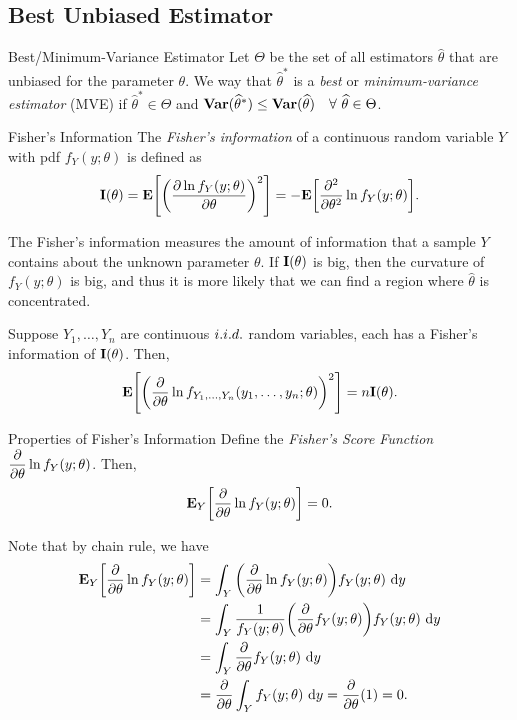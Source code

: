 \subsection{Best Unbiased Estimator}
\begin{df}{Best/Minimum-Variance Estimator}
	Let $\Theta$ be the set of all estimators $\hat\theta$ that are unbiased for the parameter $\theta$. We way that $\hat\theta^*$ is a \textit{best} or \textit{minimum-variance estimator} (MVE) if $\hat\theta^*\in\Theta$ and $\Var(\hat\theta^*)\leq\Var(\hat\theta)\quad\forall\ \hat\theta\in\Theta$.
\end{df}
\begin{df}{Fisher's Information}
	The \textit{Fisher's information} of a continuous random variable $Y$ with pdf $f_Y(y;\theta)$ is defined as \[\vb{I}(\theta)=\vb{E}\qty[\qty(\pdv{\ln f_Y(y;\theta)}{\theta})^2]=-\vb{E}\qty[\pdv[2]{\theta}\ln f_Y(y;\theta)].\]
\end{df}
\begin{rmk}
	The Fisher's information measures the amount of information that a sample $Y$ contains about the unknown parameter $\theta$. If $\vb{I}(\theta)$ is big, then the curvature of $f_Y(y;\theta)$ is big, and thus it is more likely that we can find a region where $\hat\theta$ is concentrated. 
\end{rmk}
\begin{ext}
	Suppose	$Y_1,\dots,Y_n$ are continuous $i.i.d.$ random variables, each has a Fisher's information of $\vb{I}(\theta)$. Then, \[\vb{E}\qty[\qty(\pdv{\theta}\ln f_{Y_1,\dots,Y_n}(y_1,\dots,y_n;\theta))^2]=n\vb{I}(\theta).\]
\end{ext}
\begin{thm}{Properties of Fisher's Information}
	Define the \textit{Fisher's Score Function}	$\displaystyle\pdv{\theta}\ln f_Y(y;\theta)$. Then, \[\vb{E}_Y\qty[\pdv{\theta}\ln f_Y(y;\theta)]=0.\]
\end{thm}
\begin{prf}
	Note that by chain rule, we have \begin{align*}
		\E_Y\qty[\pdv{\theta}\ln f_Y(y;\theta)]&=\int_Y\qty(\pdv{\theta}\ln f_Y(y;\theta))f_Y(y;\theta)\ \d{y}\\&=\int_Y\dfrac{1}{f_Y(y;\theta)}\qty(\pdv{\theta}f_Y(y;\theta))f_Y(y;\theta)\ \d{y}\\&=\int_Y\pdv{\theta}f_Y(y;\theta)\ \d{y}\\&=\pdv{\theta}\int_Yf_Y(y;\theta)\ \d{y}=\pdv{\theta}(1)=0.
	\end{align*}
\end{prf}
